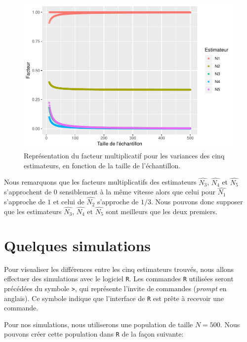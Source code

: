 \documentclass[10pt]{article}
\begin{document}
\begin{figure}[!htb]

{\centering \includegraphics[width=0.9\linewidth]{serial_number_amq_files/figure-latex/fig-facteur-1} 

}

\caption{Représentation du facteur multiplicatif pour les variances des cinq estimateurs, en fonction de la taille de l'échantillon.}\label{fig:fig-facteur}
\end{figure}

Nous remarquons que les facteurs multiplicatifs des estimateurs
\(\widehat{N_3}\), \(\widehat{N_4}\) et \(\widehat{N_5}\) s'approchent
de \(0\) sensiblement à la même vitesse alors que celui pour
\(\widehat{N_1}\) s'approche de \(1\) et celui de \(\widehat{N_2}\)
s'approche de \(1/3\). Nous pouvons donc supposer que les estimateurs
\(\widehat{N_3}\), \(\widehat{N_4}\) et \(\widehat{N_5}\) sont meilleurs
que les deux premiers.

\hypertarget{quelques-simulations}{%
\section{\texorpdfstring{Quelques simulations
\label{simul}}{Quelques simulations }}\label{quelques-simulations}}

Pour visualiser les différences entre les cinq estimateurs trouvés, nous
allons effectuer des simulations avec le logiciel \texttt{R}. Les
commandes \texttt{R} utilisées seront précédées du symbole
\texttt{\textgreater{}}, qui représente l'invite de commandes
(\emph{prompt} en anglais). Ce symbole indique que l'interface de
\texttt{R} est prête à recevoir une commande.

Pour nos simulations, nous utiliserons une population de taille
\(N=500\). Nous pouvons créer cette population dans \texttt{R} de la
façon suivante:
\end{document}
